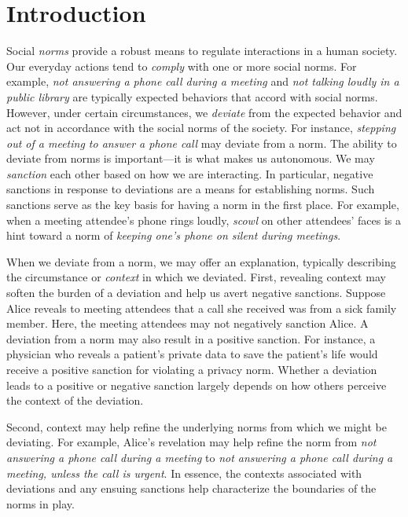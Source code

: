 \documentclass[11pt,          %
               phd,           %
               onehalfspacing %
               ]{ncsuthesis}
\newcommand{\fsl}{\textsl}
\begin{document}
\section{Introduction}
\label{sec:precious-intro}
Social \emph{norms} provide a robust means to regulate interactions in a
human society. Our everyday actions tend to \emph{comply} with one or
more social norms. For example, \fsl{not answering a phone call during a
meeting} and \fsl{not talking loudly in a public library} are typically
expected behaviors that accord with social norms. However, under certain
circumstances, we \emph{deviate} from the expected behavior and act not
in accordance with the social norms of the society. For instance,
\fsl{stepping out of a meeting to answer a phone call} may deviate from
a norm. The ability to deviate from norms is important---it is what
makes us autonomous. We may \emph{sanction} each other based on how we
are interacting. In particular, negative sanctions in response to
deviations are a means for establishing norms. Such sanctions serve as
the key basis for having a norm in the first place. For example, when a
meeting attendee's phone rings loudly, \fsl{scowl} on other attendees'
faces is a hint toward a norm of \fsl{keeping one's phone on silent
during meetings}.

When we deviate from a norm, we may offer an explanation, typically
describing the circumstance or \emph{context} in which we deviated.
First, revealing context may soften the burden of a deviation and help
us avert negative sanctions. Suppose Alice reveals to meeting attendees
that a call she received was from a sick family member. Here, the
meeting attendees may not negatively sanction Alice. A deviation from a
norm may also result in a positive sanction. For instance, a physician
who reveals a patient's private data to save the patient's life would
receive a positive sanction for violating a privacy norm. Whether a
deviation leads to a positive or negative sanction largely depends on
how others perceive the context of the deviation.

Second, context may help refine the underlying norms from which we might
be deviating. For example, Alice's revelation may help refine the norm
from \fsl{not answering a phone call during a meeting} to \fsl{not
answering a phone call during a meeting, unless the call is urgent}. In
essence, the contexts associated with deviations and any ensuing
sanctions help characterize the boundaries of the norms in play.
\end{document}
